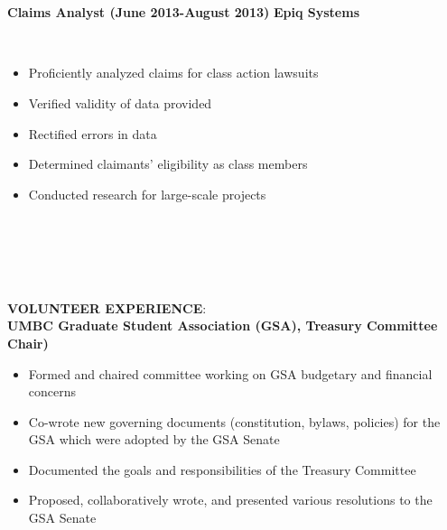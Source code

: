 \documentclass{article}
\begin{document}
\phantom \\
\phantom \\
%
%
%
%
\begin{vwcol}[widths={0.8,0.2}, sep=.8cm, justify=flush, rule=0pt, indent=0em]
\noindent \textbf{Claims Analyst (June 2013-August 2013)}
\newpage
\noindent \textbf{Epiq Systems}
\end{vwcol}
\phantom \\
\begin{itemize}
\item Proficiently analyzed claims for class action lawsuits
\item Verified validity of data provided
\item Rectified errors in data
\item Determined claimants' eligibility as class members
\item Conducted research for large-scale projects
\end{itemize}
\phantom \\
\phantom \\
%
%
%
%
\par
\phantom \\
\phantom \\
\noindent \textbf{VOLUNTEER EXPERIENCE}:\\
\noindent \textbf{UMBC Graduate Student Association (GSA), Treasury Committee Chair)}
\phantom \\
\begin{itemize}
\item Formed and chaired committee working on GSA budgetary and financial concerns
\item Co-wrote new governing documents (constitution, bylaws, policies) for the GSA which were adopted by the GSA Senate
\item Documented the goals and responsibilities of the Treasury Committee
\item Proposed, collaboratively wrote, and presented various resolutions to the GSA Senate
\end{itemize}
\end{document}

